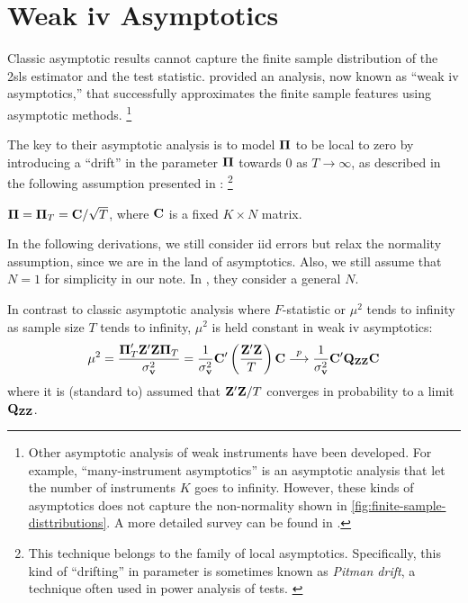 \documentclass[a4paper]{article}
\begin{document}
\section{Weak \gls*{iv} Asymptotics}

Classic asymptotic results cannot capture the finite sample distribution
of the \gls*{2sls} estimator and the test statistic.
\textcite{staiger-stock-1997} provided an analysis,
now known as ``weak \gls*{iv} asymptotics,''
that successfully approximates the finite sample features using asymptotic methods.%
\footnote{
	Other asymptotic analysis of weak instruments have been developed.
	For example, ``many-instrument asymptotics'' is an asymptotic analysis
	that let the number of instruments $K$ goes to infinity.
	However,
	these kinds of asymptotics does not capture the non-normality shown in \autoref{fig:finite-sample-disttributions}.
	A more detailed survey can be found in \textcite{stock-wright-yogo-2002}.
}

The key to their asymptotic analysis is to model $\boldsymbol{\Pi}$ to be local to zero
by introducing a ``drift'' in the parameter $\boldsymbol{\Pi}$ towards $0$ as $T\to\infty$,
as described in the following assumption presented in \textcite{staiger-stock-1997}:%
\footnote{
	This technique belongs to the family of local asymptotics.
	Specifically, this kind of ``drifting'' in parameter is sometimes known as \emph{Pitman drift},
	a technique often used in power analysis of tests.
	\parencite{stock-wright-yogo-2002}
}

\begin{assumption*}[$L_{\PI}$]\label{ass:local-PI}
	$\boldsymbol{\Pi} = \boldsymbol{\Pi}_T=\mathbf{C}/\sqrt{T}$, where $\mathbf{C}$ is a fixed $K\times N$ matrix.
\end{assumption*}

\noindent
In the following derivations,
we still consider \gls*{iid} errors but relax the normality assumption,
since we are in the land of asymptotics.
Also, we still assume that $N=1$ for simplicity in our note.
In \textcite{staiger-stock-1997}, they consider a general $N$.

\begin{remark}
	In contrast to classic asymptotic analysis where $F$-statistic or $\mu^2$
	tends to infinity as sample size $T$ tends to infinity,
	$\mu^2$ is held constant in weak \gls*{iv} asymptotics:
	\begin{align*}
		\mu^2
		= \frac{ \boldsymbol{\Pi}_T'\mathbf{Z}'\mathbf{Z}\boldsymbol{\Pi}_T }{ \sigma_{\mathbf{v}}^2 }
		= \frac1{\sigma_{\mathbf{v}}^2} \mathbf{C}' \left(\frac{\mathbf{Z}'\mathbf{Z}}{T}\right) \mathbf{C}
		\overset{p}{\longrightarrow} \frac1{\sigma_{\mathbf{v}}^2} \mathbf{C}' \mathbf{Q}_{\mathbf{Z}\mathbf{Z}} \mathbf{C}
	\end{align*}
	where it is (standard to) assumed that $\mathbf{Z}'\mathbf{Z}/T$ converges in probability to a limit $\mathbf{Q}_{\mathbf{Z}\mathbf{Z}}$.
\end{remark}
\end{document}
